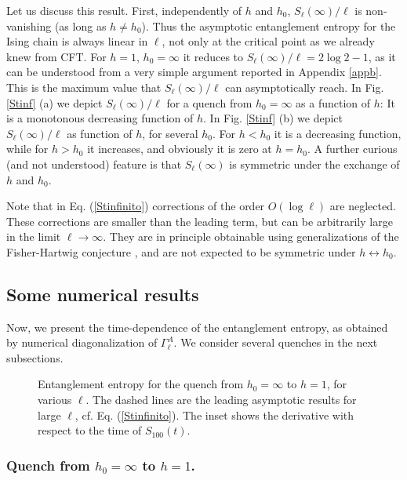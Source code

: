 Let us discuss this result. 
First, independently of $h$ and $h_0$,  $S_\ell(\infty)/\ell$ is 
non-vanishing (as long as $h\neq h_0$). 
Thus the asymptotic entanglement entropy for the Ising chain is always linear
in $\ell$, not only at the critical point as we already knew from CFT.  
For $h=1$, $h_0=\infty$ it reduces to $S_\ell(\infty)/\ell=2 \log2-1$, 
as it can be understood from a very simple argument reported in 
Appendix \ref{appb}. 
This is the maximum value that $S_\ell(\infty)/\ell$ can asymptotically reach.
In Fig. \ref{Stinf} (a) we depict $S_\ell(\infty)/\ell$ for a quench from 
$h_0=\infty$ as a function of $h$: It is a monotonous decreasing function of 
$h$. 
In Fig. \ref{Stinf} (b) we depict $S_\ell(\infty)/\ell$ as function of $h$, for 
several $h_0$. 
For $h<h_0$ it is a decreasing function, while for $h>h_0$ it increases, and 
obviously it is zero at $h=h_0$.
A further curious (and not understood) feature is that $S_\ell(\infty)$ is 
symmetric under the exchange of $h$ and $h_0$.

Note that in Eq. (\ref{Stinfinito}) corrections of the order $O(\log \ell)$
are neglected. These corrections are smaller than the leading term, but can be
arbitrarily large in the limit $\ell\rightarrow\infty$. 
They are in principle obtainable using generalizations 
of the Fisher-Hartwig conjecture \cite{ijk-04}, and are not expected 
to be symmetric under $h\leftrightarrow h_0$.


\subsection{Some numerical results}

Now, we present the time-dependence of the entanglement entropy, as 
obtained by numerical diagonalization of $\Gamma^A_\ell$.
We consider several quenches in the next subsections.



\begin{figure}[t]
\centerline{}
\caption{Entanglement entropy for the quench from $h_0=\infty$ to $h=1$, for 
various $\ell$. 
The dashed lines are the leading asymptotic results for large $\ell$, cf. 
Eq. (\ref{Stinfinito}).
The inset shows the derivative with respect to the time of $S_{100}(t)$.}
\label{SLL}
\end{figure}

\subsubsection{Quench from $h_0=\infty$ to $h=1$.}

